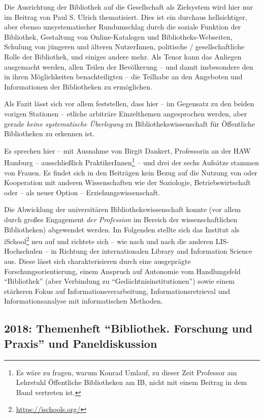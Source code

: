 \documentclass[a4paper,
fontsize=11pt,
oneside,
numbers=noperiodatend,
parskip=half-,
bibliography=totoc,
final
]{scrartcl}
\begin{document}
Die Ausrichtung der Bibliothek auf die Gesellschaft als Zielsystem wird
hier nur im Beitrag von Paul S. Ulrich thematisiert. Dies ist ein
durchaus hellsichtiger, aber ebenso unsystematischer Rundumschlag durch
die soziale Funktion der Bibliothek, Gestaltung von Online-Katalogen und
Bibliotheks-Webseiten, Schulung von jüngeren und älteren NutzerInnen,
politische / gesellschaftliche Rolle der Bibliothek, und einiges andere
mehr. Als Tenor kann das Anliegen ausgemacht werden, allen Teilen der
Bevölkerung -- und damit insbesondere den in ihren Möglichkeiten
benachteiligten -- die Teilhabe an den Angeboten und Informationen der
Bibliotheken zu ermöglichen.

Als Fazit lässt sich vor allem feststellen, dass hier -- im Gegensatz zu
den beiden vorigen Stationen -- etliche arbiträre Einzelthemen
angesprochen werden, aber gerade \emph{keine systematische Überlegung}
zu Bibliothekswissenschaft für Öffentliche Bibliotheken zu erkennen ist.

Es sprechen hier -- mit Ausnahme von Birgit Dankert, Professorin an der
HAW Hamburg -- ausschließlich PraktikerInnen\footnote{Es wäre zu fragen,
  warum Konrad Umlauf, zu dieser Zeit Professor am Lehrstuhl Öffentliche
  Bibliotheken am IB, nicht mit einem Beitrag in dem Band vertreten ist.}
-- und drei der sechs Aufsätze stammen von Frauen. Es findet sich in den
Beiträgen kein Bezug auf die Nutzung von oder Kooperation mit anderen
Wissenschaften wie der Soziologie, Betriebswirtschaft oder -- als neuer
Option -- Erziehungswissenschaft.

Die Abwicklung der universitären Bibliothekswissenschaft konnte (vor
allem durch großes Engagement \emph{der Profession} im Bereich der
wissenschaftlichen Bibliotheken) abgewendet werden. Im Folgenden stellte
sich das Institut als iSchool\footnote{\url{https://ischools.org/}} neu
auf und richtete sich -- wie nach und nach die anderen LIS-Hochschulen
-- in Richtung der internationalen Library and Information Science aus.
Diese lässt sich charakterisieren durch eine ausgeprägte
Forschungsorientierung, einem Anspruch auf Autonomie vom Handlungsfeld
\enquote{Bibliothek} (aber Verbindung zu
\enquote{Gedächtnisinstitutionen}) sowie einem stärkeren Fokus auf
Informationsverarbeitung, Informationsretrieval und Informationsanalyse
mit informatischen Methoden.

\hypertarget{themenheft-bibliothek.-forschung-und-praxis-und-paneldiskussion}{%
\subsection{\texorpdfstring{2018: Themenheft \enquote{Bibliothek.
Forschung und Praxis} und
Paneldiskussion}{2018: Themenheft ``Bibliothek. Forschung und Praxis'' und Paneldiskussion}}\label{themenheft-bibliothek.-forschung-und-praxis-und-paneldiskussion}}
\end{document}
